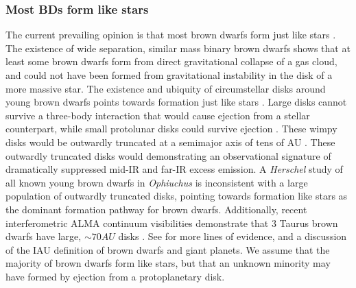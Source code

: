 \subsubsection{Most BDs form like stars}
The current prevailing opinion is that most brown dwarfs form just like stars \citep{2014prpl.conf..619C}.  The existence of wide separation, similar mass binary brown dwarfs \citep{2004ApJ...614..398L,2006PhDT.........2A,2007ApJ...660.1492C,2009ApJ...691.1265L} shows that at least some brown dwarfs form from direct gravitational collapse of a gas cloud, and could not have been formed from gravitational instability in the disk of a more massive star.  The existence and ubiquity of circumstellar disks around young brown dwarfs points towards formation just like stars \citep{2005ApJ...635L..93L,allers06,2012ARA&A..50...65L,2013A&A...559A.126A}.  Large disks cannot survive a three-body interaction that would cause ejection from a stellar counterpart, while small protolunar disks could survive ejection \citep{2009MNRAS.392..413S}.  These wimpy disks would be outwardly truncated at a semimajor axis of tens of AU \citep{2009MNRAS.392..413S}.  These outwardly truncated disks would demonstrating an observational signature of dramatically suppressed mid-IR and far-IR excess emission.  A \emph{Herschel} study of all known young brown dwarfs in \emph{Ophiuchus} \citep{2013A&A...559A.126A} is inconsistent with a large population of outwardly truncated disks, pointing towards formation like stars as the dominant formation pathway for brown dwarfs.  Additionally, recent interferometric ALMA continuum visibilities demonstrate that 3 Taurus brown dwarfs have large, $\sim70 AU$ disks \citep{2014ApJ...791...20R}.  See \citet{2014prpl.conf..619C} for more lines of evidence, and a discussion of the IAU definition of brown dwarfs and giant planets.  We assume that the majority of brown dwarfs form like stars, but that an unknown minority may have formed by ejection from a protoplanetary disk.

